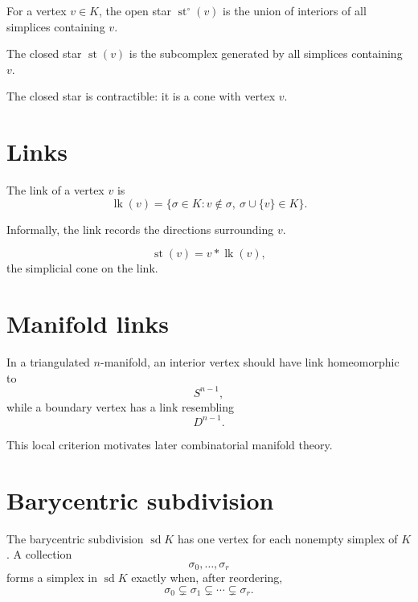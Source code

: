 \begin{definition}
\label{def:viii15-open-star}
For a vertex \(v\in K\), the open star \(\operatorname{st}^\circ(v)\) is the
union of interiors of all simplices containing \(v\).
\end{definition}

\begin{definition}
\label{def:viii15-closed-star}
The closed star \(\operatorname{st}(v)\) is the subcomplex generated by all
simplices containing \(v\).
\end{definition}

The closed star is contractible: it is a cone with vertex \(v\).

\section{Links}

\begin{definition}[Link]
\label{def:viii15-link}
The link of a vertex \(v\) is
\[
\operatorname{lk}(v)
=
\{\sigma\in K:
v\notin\sigma,\ \sigma\cup\{v\}\in K\}.
\]
\end{definition}

Informally, the link records the directions surrounding \(v\).

\begin{proposition}
\label{prop:viii15-star-cone}
\[
\operatorname{st}(v)
=
v*\operatorname{lk}(v),
\]
the simplicial cone on the link.
\end{proposition}

\section{Manifold links}

In a triangulated \(n\)-manifold, an interior vertex should have link
homeomorphic to
\[
S^{n-1},
\]
while a boundary vertex has a link resembling
\[
D^{n-1}.
\]

This local criterion motivates later combinatorial manifold theory.

\section{Barycentric subdivision}

\begin{definition}
\label{def:viii15-barycentric}
The barycentric subdivision \(\operatorname{sd}K\) has one vertex for each
nonempty simplex of \(K\).  A collection
\[
\sigma_0,\dots,\sigma_r
\]
forms a simplex in \(\operatorname{sd}K\) exactly when, after reordering,
\[
\sigma_0\subsetneq\sigma_1\subsetneq\cdots\subsetneq\sigma_r.
\]
\end{definition}

